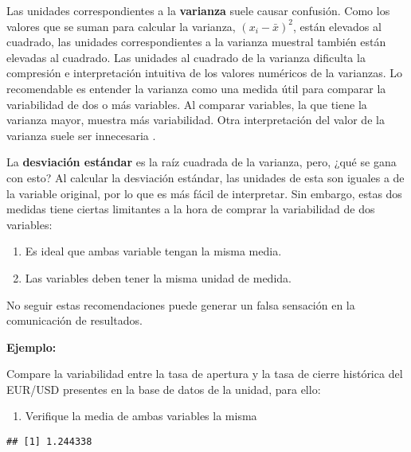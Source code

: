 \documentclass[
]{book}
\newenvironment{Shaded}{\begin{snugshade}}{\end{snugshade}}
\newcommand{\CommentTok}[1]{\textcolor[rgb]{0.56,0.35,0.01}{\textit{#1}}}
\newcommand{\FunctionTok}[1]{\textcolor[rgb]{0.00,0.00,0.00}{#1}}
\newcommand{\NormalTok}[1]{#1}
\newcommand{\SpecialCharTok}[1]{\textcolor[rgb]{0.00,0.00,0.00}{#1}}
\providecommand{\tightlist}{%
  \setlength{\itemsep}{0pt}\setlength{\parskip}{0pt}}
\begin{document}
Las unidades correspondientes a la \textbf{varianza} suele causar confusión. Como los valores que se suman para calcular la varianza, \((x_i-\bar{x})^2\), están elevados al cuadrado, las unidades correspondientes a la varianza muestral también están elevadas al cuadrado. Las unidades al cuadrado de la varianza dificulta la compresión e interpretación intuitiva de los valores numéricos de la varianzas. Lo recomendable es entender la varianza como una medida útil para comparar la variabilidad de dos o más variables. Al comparar variables, la que tiene la varianza mayor, muestra más variabilidad. Otra interpretación del valor de la varianza suele ser innecesaria \citep[página 94]{anderson}.

La \textbf{desviación estándar} es la raíz cuadrada de la varianza, pero, ¿qué se gana con esto? Al calcular la desviación estándar, las unidades de esta son iguales a de la variable original, por lo que es más fácil de interpretar. Sin embargo, estas dos medidas tiene ciertas limitantes a la hora de comprar la variabilidad de dos variables:

\begin{enumerate}
\def\labelenumi{\arabic{enumi}.}
\tightlist
\item
  Es ideal que ambas variable tengan la misma media.
\item
  Las variables deben tener la misma unidad de medida.
\end{enumerate}

No seguir estas recomendaciones puede generar un falsa sensación en la comunicación de resultados.

\textbf{Ejemplo:}

Compare la variabilidad entre la tasa de apertura y la tasa de cierre histórica del EUR/USD presentes en la base de datos de la unidad, para ello:

\begin{enumerate}
\def\labelenumi{\arabic{enumi}.}
\tightlist
\item
  Verifique la media de ambas variables la misma
\end{enumerate}

\begin{Shaded}
\end{Shaded}

\begin{verbatim}
## [1] 1.244338
\end{verbatim}
\end{document}
